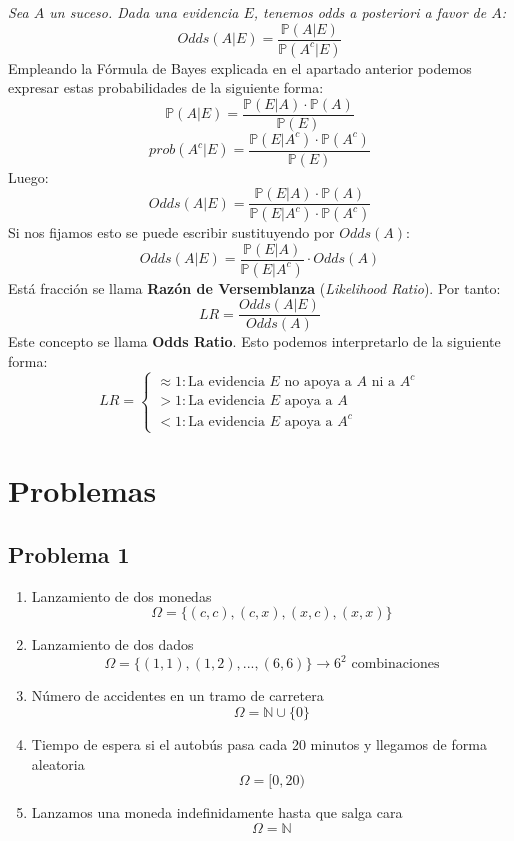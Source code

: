 \documentclass[11pt]{article}
\newcommand{\N}{\mathbb{N}}
\newcommand{\prob}{\mathbb{P}}
\newcommand{\OMG}{\varOmega}
\theoremstyle{plain}
\begin{document}
            \textit{Sea $A$ un suceso. Dada una evidencia $E$, tenemos odds a posteriori a favor de $A$:}
            \[Odds(A|E) = \frac{\prob(A|E)}{\prob(A^c|E)}\]
            Empleando la Fórmula de Bayes explicada en el apartado anterior podemos expresar estas probabilidades de la siguiente forma:
            \[\prob(A|E) = \frac{\prob(E|A) \cdot \prob(A)}{\prob(E)}\]
            \[prob(A^c|E) = \frac{\prob(E|A^c)\cdot \prob(A^c)}{\prob(E)}\]
            Luego:
            \[Odds(A|E) = \frac{\prob(E|A) \cdot \prob(A)}{\prob(E|A^c)\cdot \prob(A^c)}\]
            Si nos fijamos esto se puede escribir sustituyendo por $Odds(A)$:
            \[Odds(A|E) = \frac{\prob(E|A)}{\prob(E|A^c)}\cdot Odds(A)\]
            Está fracción se llama \textbf{Razón de Versemblanza} (\textit{Likelihood Ratio}). Por tanto:
            \[LR = \frac{Odds(A|E)}{Odds(A)}\]
            Este concepto se llama \textbf{Odds Ratio}. Esto podemos interpretarlo de la siguiente forma:
            \begin{equation}
                LR = 
                \begin{cases}
                    \approx 1: \text{La evidencia $E$ no apoya a $A$ ni a $A^c$}\\
                    > 1: \text{La evidencia $E$ apoya a $A$}\\
                    < 1:  \text{La evidencia $E$ apoya a $A^c$}    
                \end{cases}
            \end{equation}
 




    \newpage
    \section{Problemas} %
    \label{sec:problemas}
        \subsection{Problema 1} %
        \label{sub:problema_1}
            \begin{enumerate}[label=\Alph*]
                \item Lanzamiento de dos monedas \[\OMG = \{(c,c),(c,x),(x,c),(x,x)\}\]
                \item Lanzamiento de dos dados \[\OMG = \{(1,1),(1,2),...,(6,6)\} \rightarrow 6^2 \text{ combinaciones}\]
                \item Número de accidentes en un tramo de carretera \[\OMG = \N \cup \{0\}\]
                \item Tiempo de espera si el autobús pasa cada 20 minutos y llegamos de forma aleatoria \[\OMG = [0,20)\]
                \item Lanzamos una moneda indefinidamente hasta que salga cara \[\OMG = \N\] 
            \end{enumerate}        
\end{document}
